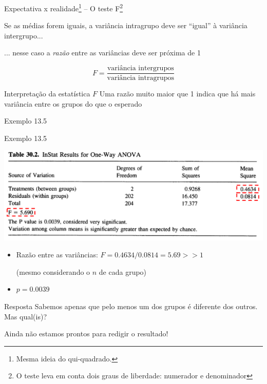 \documentclass{beamer}
\begin{document}
\begin{frame}{Expectativa x realidade\footnote{\scriptsize Mesma ideia do qui-quadrado.} -- O teste F\footnote{\scriptsize O teste leva em conta dois graus de liberdade: numerador e denominador}}
  \begin{block}{}
    \small
    Se as médias forem iguais, a variância intragrupo deve ser ``igual'' à variância intergrupo...

    \bigskip
    ... nesse caso a {\em razão} entre as variâncias deve ser próxima de 1
  \end{block}

  $$F = \frac{\text{variância intergrupos}}{\text{variância intragrupos}}$$

  \begin{block}{Interpretação da estatística $F$}
    Uma razão muito maior que 1 indica que há mais variância entre os grupos do que o esperado
  \end{block}
\end{frame}

\begin{frame}[label=exemplo13.5-anova]{\small Exemplo 13.5}
  \begin{exampleblock}{Exemplo 13.5}
    \begin{center}
      \includegraphics[width=\textwidth]{Cap13-30/exemplo13_5-3}
    \end{center}
    \begin{itemize}
      \scriptsize
    \item Razão entre as variâncias: $F = 0.4634/0.0814 = 5.69 >> 1$

      {\tiny (mesmo considerando o $n$ de cada grupo)}
    \item $p=0.0039$
    \end{itemize}
  \end{exampleblock}
\end{frame}

\begin{frame}{}
  \begin{block}{Resposta}
    Sabemos apenas que pelo menos um dos grupos é diferente dos outros.
    Mas qual(is)?

    \bigskip
    Ainda não estamos prontos para redigir o resultado!
  \end{block}
\end{frame}
\end{document}
